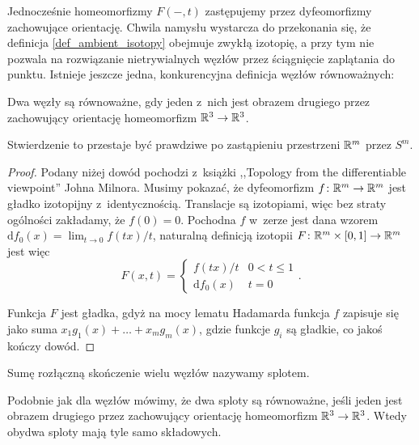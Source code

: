 Jednocześnie homeomorfizmy $F(-,t)$ zastępujemy przez dyfeomorfizmy zachowujące orientację.
Chwila namysłu wystarcza do przekonania się, że definicja \ref{def_ambient_isotopy} obejmuje zwykłą izotopię,
a przy tym nie pozwala na rozwiązanie nietrywialnych węzłów przez ściągnięcie zaplątania do punktu.
Istnieje jeszcze jedna, konkurencyjna definicja węzłów równoważnych:

\begin{definition}
    Dwa węzły są równoważne, gdy jeden z~nich jest obrazem drugiego przez zachowujący orientację homeomorfizm $\mathbb R^3 \to \mathbb R^3$.
\end{definition}

Stwierdzenie to przestaje być prawdziwe po zastąpieniu przestrzeni $\mathbb R^m$ przez $S^m$.

\begin{proof}
    Podany niżej dowód pochodzi z~książki ,,Topology from the differentiable viewpoint'' Johna Milnora.
    Musimy pokazać, że dyfeomorfizm $f \colon \mathbb R^m \to \mathbb R^m$ jest gładko izotopijny z~identycznością.
    Translacje są izotopiami, więc bez straty ogólności zakładamy, że $f(0) = 0$.
    Pochodna $f$ w~zerze jest dana wzorem $\mathrm{d}f_0(x) = \lim_{t \to 0} f(tx) /t$,
    naturalną definicją    izotopii $F \colon \mathbb R^m \times [0, 1] \to \mathbb R^m$ jest więc
    \[
        F(x, t) = \begin{cases}
            f(tx) / t & 0 < t \le 1 \\
            \mathrm{d}f_0(x) & t = 0
        \end{cases} .
    \]

    Funkcja $F$ jest gładka,
    gdyż na mocy lematu Hadamarda funkcja $f$ zapisuje się jako suma $x_1 g_1(x) + \ldots + x_mg_m(x)$,
    gdzie funkcje $g_i$ są gładkie, co jakoś kończy dowód.
\end{proof}

\begin{definition}[splot]
    \label{def_link}
    Sumę rozłączną skończenie wielu węzłów nazywamy splotem.
\end{definition}

Podobnie jak dla węzłów mówimy, że dwa sploty są równoważne, jeśli jeden jest obrazem drugiego przez zachowujący orientację homeomorfizm $\mathbb R^3 \to \mathbb R^3$.
Wtedy obydwa sploty mają tyle samo składowych.

